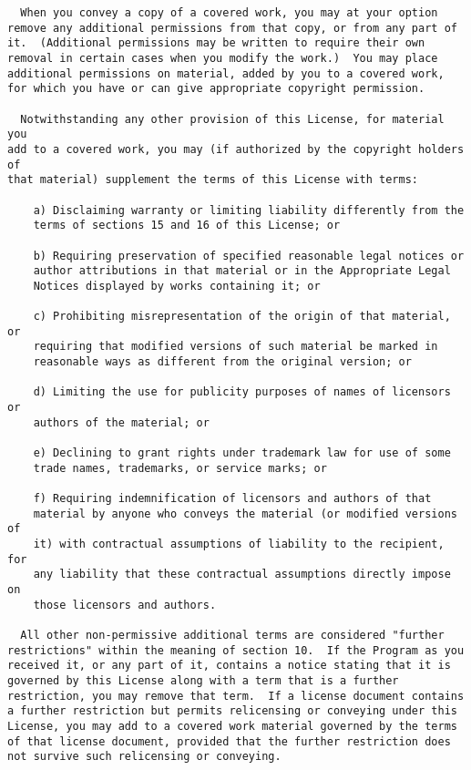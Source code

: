 \documentclass[11pt]{article}
\begin{document}
\begin{verbatim}
  When you convey a copy of a covered work, you may at your option
remove any additional permissions from that copy, or from any part of
it.  (Additional permissions may be written to require their own
removal in certain cases when you modify the work.)  You may place
additional permissions on material, added by you to a covered work,
for which you have or can give appropriate copyright permission.

  Notwithstanding any other provision of this License, for material you
add to a covered work, you may (if authorized by the copyright holders of
that material) supplement the terms of this License with terms:

    a) Disclaiming warranty or limiting liability differently from the
    terms of sections 15 and 16 of this License; or

    b) Requiring preservation of specified reasonable legal notices or
    author attributions in that material or in the Appropriate Legal
    Notices displayed by works containing it; or

    c) Prohibiting misrepresentation of the origin of that material, or
    requiring that modified versions of such material be marked in
    reasonable ways as different from the original version; or

    d) Limiting the use for publicity purposes of names of licensors or
    authors of the material; or

    e) Declining to grant rights under trademark law for use of some
    trade names, trademarks, or service marks; or

    f) Requiring indemnification of licensors and authors of that
    material by anyone who conveys the material (or modified versions of
    it) with contractual assumptions of liability to the recipient, for
    any liability that these contractual assumptions directly impose on
    those licensors and authors.

  All other non-permissive additional terms are considered "further
restrictions" within the meaning of section 10.  If the Program as you
received it, or any part of it, contains a notice stating that it is
governed by this License along with a term that is a further
restriction, you may remove that term.  If a license document contains
a further restriction but permits relicensing or conveying under this
License, you may add to a covered work material governed by the terms
of that license document, provided that the further restriction does
not survive such relicensing or conveying.


\end{verbatim}
\end{document}
